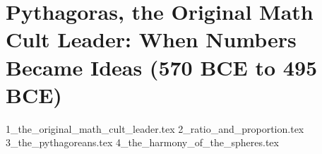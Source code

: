 \section{Pythagoras, the Original Math Cult Leader: When Numbers Became Ideas (570 BCE to 495 BCE)}

{1_the_original_math_cult_leader.tex}
{2_ratio_and_proportion.tex}
{3_the_pythagoreans.tex}
{4_the_harmony_of_the_spheres.tex}